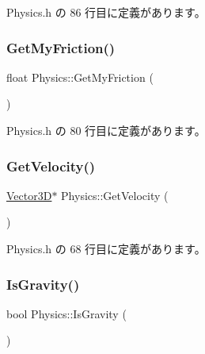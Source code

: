  Physics.\+h の 86 行目に定義があります。

\mbox{\label{class_physics_a50ad9d79f3b42a209a05f57557f294f0}} 
\subsubsection{\texorpdfstring{Get\+My\+Friction()}{GetMyFriction()}}
{\footnotesize\ttfamily float Physics\+::\+Get\+My\+Friction (\begin{DoxyParamCaption}{ }\end{DoxyParamCaption})\hspace{0.3cm}{\ttfamily [inline]}}



 Physics.\+h の 80 行目に定義があります。

\mbox{\label{class_physics_a8e33f600575e7ee5ad348d695a9eb45e}} 
\subsubsection{\texorpdfstring{Get\+Velocity()}{GetVelocity()}}
{\footnotesize\ttfamily \mbox{\hyperlink{class_vector3_d}{Vector3D}}$\ast$ Physics\+::\+Get\+Velocity (\begin{DoxyParamCaption}{ }\end{DoxyParamCaption})\hspace{0.3cm}{\ttfamily [inline]}}



 Physics.\+h の 68 行目に定義があります。

\mbox{\label{class_physics_a666e85a519fcb5f350a1f42273842f4d}} 
\subsubsection{\texorpdfstring{Is\+Gravity()}{IsGravity()}}
{\footnotesize\ttfamily bool Physics\+::\+Is\+Gravity (\begin{DoxyParamCaption}{ }\end{DoxyParamCaption})\hspace{0.3cm}{\ttfamily [inline]}}



